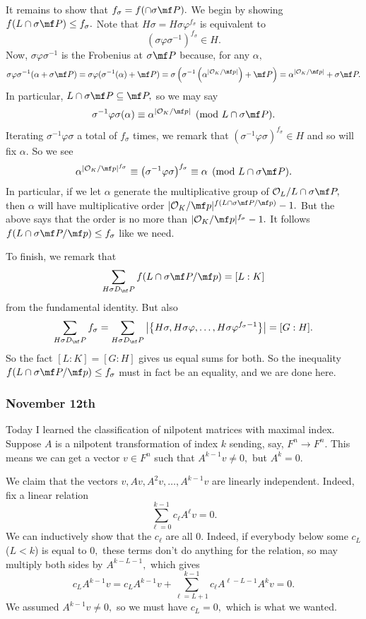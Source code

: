 It remains to show that $f_\sigma=f(\cap\sigma\mf P).$ We begin by showing $f(L\cap\sigma\mf P)\le f_\sigma.$ Note that $H\sigma=H\sigma\varphi^{f_\sigma}$ is equivalent to
\[\left(\sigma\varphi\sigma^{-1}\right)^{f_\sigma}\in H.\]
Now, $\sigma\varphi\sigma^{-1}$ is the Frobenius at $\sigma\mf P$ because, for any $\alpha,$
\[\sigma\varphi\sigma^{-1}(\alpha+\sigma\mf P)=\sigma\varphi(\sigma^{-1}(\alpha)+\mf P)=\sigma\left(\sigma^{-1}\left(\alpha^{|\mathcal O_K/\mf p|}\right)+\mf P\right)=\alpha^{|\mathcal O_K/\mf p|}+\sigma\mf P.\]
In particular, $L\cap\sigma\mf P\subseteq\mf P,$ so we may say
\[\sigma^{-1}\varphi\sigma(\alpha)\equiv\alpha^{|\mathcal O_K/\mf p|}\pmod{L\cap\sigma\mf P}.\]
Iterating $\sigma^{-1}\varphi\sigma$ a total of $f_\sigma$ times, we remark that $\left(\sigma^{-1}\varphi\sigma\right)^{f_\sigma}\in H$ and so will fix $\alpha.$ So we see
\[\alpha^{|\mathcal O_K/\mf p|^{f_\sigma}}\equiv\left(\sigma^{-1}\varphi\sigma\right)^{f_\sigma}\equiv\alpha\pmod{L\cap\sigma\mf P}.\]
In particular, if we let $\alpha$ generate the multiplicative group of $\mathcal O_L/L\cap\sigma\mf P,$ then $\alpha$ will have multiplicative order $|\mathcal O_K/\mf p|^{f(L\cap\sigma\mf P/\mf p)}-1.$ But the above says that the order is no more than $|\mathcal O_K/\mf p|^{f_\sigma}-1.$ It follows $f(L\cap\sigma\mf P/\mf p)\le f_\sigma$ like we need.

To finish, we remark that
\[\sum_{H\sigma D_\mf P}f(L\cap\sigma\mf P/\mf p)=[L:K]\]
from the fundamental identity. But also
\[\sum_{H\sigma D_\mf P}f_\sigma=\sum_{H\sigma D_\mf P}\left|\left\{H\sigma,H\sigma\varphi,\ldots,H\sigma\varphi^{f_\sigma-1}\right\}\right|=[G:H].\]
So the fact $[L:K]=[G:H]$ gives us equal sums for both. So the inequality $f(L\cap\sigma\mf P/\mf p)\le f_\sigma$ must in fact be an equality, and we are done here.

\subsubsection{November 12th}
Today I learned the classification of nilpotent matrices with maximal index. Suppose $A$ is a nilpotent transformation of index $k$ sending, say, $F^n\to F^n.$ This means we can get a vector $v\in F^n$ such that $A^{k-1}v\ne0,$ but $A^k=0.$

We claim that the vectors $v,Av,A^2v,\ldots,A^{k-1}v$ are linearly independent. Indeed, fix a linear relation
\[\sum_{\ell=0}^{k-1}c_\ell A^\ell v=0.\]
We can inductively show that the $c_\ell$ are all $0.$ Indeed, if everybody below some $c_L$ ($L<k$) is equal to $0,$ these terms don't do anything for the relation, so may multiply both sides by $A^{k-L-1},$ which gives
\[c_LA^{k-1}v=c_LA^{k-1}v+\sum_{\ell=L+1}^{k-1}c_\ell A^{\ell-L-1}A^kv=0.\]
We assumed $A^{k-1}v\ne0,$ so we must have $c_L=0,$ which is what we wanted.

